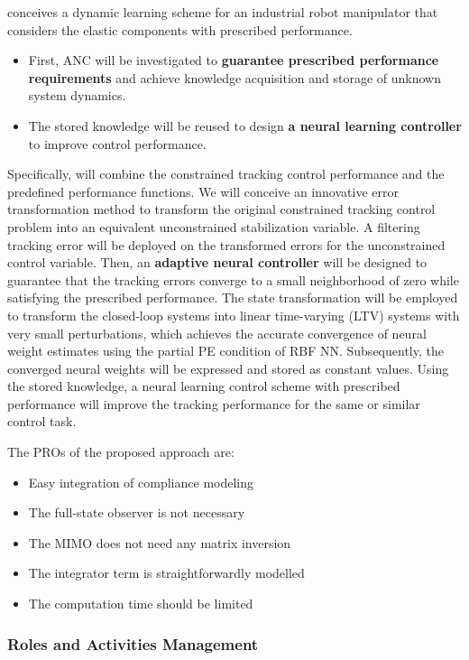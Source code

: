  conceives a dynamic learning scheme for an industrial
robot manipulator that considers the elastic components with prescribed
performance.

\begin{itemize}
\item
  First, ANC will be investigated to \textbf{guarantee prescribed
  performance requirements} and achieve knowledge acquisition and
  storage of unknown system dynamics.
\item
  The stored knowledge will be reused to design \textbf{a neural
  learning controller} to improve control performance.
\end{itemize}

Specifically,  will combine the constrained tracking
control performance and the predefined performance functions. We will
conceive an innovative error transformation method to transform the
original constrained tracking control problem into an equivalent
unconstrained stabilization variable. A filtering tracking error will be
deployed on the transformed errors for the unconstrained control
variable. Then, an \textbf{adaptive neural controller} will be designed
to guarantee that the tracking errors converge to a small neighborhood
of zero while satisfying the prescribed performance. The state
transformation will be employed to transform the closed-loop systems
into linear time-varying (LTV) systems with very small perturbations,
which achieves the accurate convergence of neural weight estimates using
the partial PE condition of RBF NN. Subsequently, the converged neural
weights will be expressed and stored as constant values. Using the
stored knowledge, a neural learning control scheme with prescribed
performance will improve the tracking performance for the same or
similar control task.

The PROs of the proposed approach are:

\begin{itemize}
\item
  Easy integration of compliance modeling
\item
  The full-state observer is not necessary
\item
  The MIMO does not need any matrix inversion
\item
  The integrator term is straightforwardly modelled
\item
  The computation time should be limited
\end{itemize}

\subsubsection{\texorpdfstring{Roles and Activities Management
}{Roles and Activities Management }}\label{roles-and-activities-management-2}

